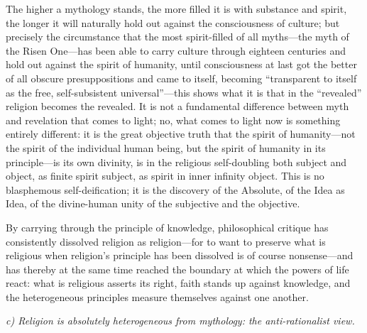 \documentclass[12pt,a4paper]{article}
\begin{document}
The higher a mythology stands, the more filled it is with
substance and spirit, the longer it will naturally hold out
against the consciousness of culture; but precisely the
circumstance that the most spirit-filled of all myths---the myth
of the Risen One---has been able to carry culture through
eighteen centuries and hold out against the spirit of humanity,
until consciousness at last got the better of all obscure
presuppositions and came to itself, becoming ``transparent to
itself as the free, self-subsistent universal''---this shows
what it is that in the ``revealed'' religion becomes the
revealed. It is not a fundamental difference between myth and
revelation that comes to light; no, what comes to light now is
something entirely different: it is the great objective truth
that the spirit of humanity---not the spirit of the individual
human being, but the spirit of humanity in its principle---is
its own divinity, is in the religious self-doubling both subject
and object, as finite spirit subject, as spirit in inner
infinity object. This is no blasphemous self-deification; it is
the discovery of the Absolute, of the Idea as Idea, of the
divine-human unity of the subjective and the objective.

By carrying through the principle of knowledge, philosophical
critique has consistently dissolved religion as religion---for
to want to preserve what is religious when religion's principle
has been dissolved is of course nonsense---and has thereby at
the same time reached the boundary at which the powers of life
react: what is religious asserts its right, faith stands up
against knowledge, and the heterogeneous principles measure
themselves against one another.

\medskip

\noindent\textit{c) Religion is absolutely heterogeneous from mythology: the anti-rationalist view.}

\medskip
\end{document}
